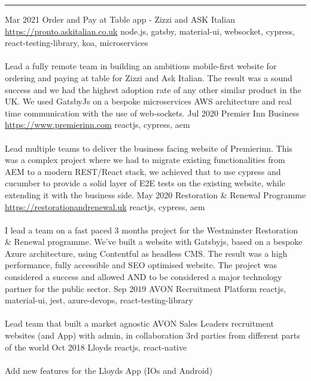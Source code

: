 \documentclass[9pt]{stackoverflow} %
\begin{document}
\textcolor{stackoverflow}{\hrule}
\vspace{4pt} %
\begin{tcolorbox}[blanker,width=0.75\textwidth,enlarge left by=0.25\textwidth,before skip=6pt,breakable,
	overlay unbroken and first={%
	  \node[inner sep=0pt,outer sep=0pt,text width=0.35\textwidth,
		align=none,
		below right]
		at ([xshift=-0.25\textwidth]frame.north west)
{
	\vspace{\baselineskip} %
	\cvsect{Apps \& Software}
};}]
{\vspace{-16.3pt} %
	\small\begin{entrylist}
	\entry
		{Mar 2021}
		{Order and Pay at Table app - Zizzi and ASK Italian}
		{\href{https://pronto.askitalian.co.uk}{https://pronto.askitalian.co.uk}}
		{{node.js, gatsby, material-ui, websocket, cypress, react-testing-library, koa, microservices}\\\\
		Lead a fully remote team in building an ambitious mobile-first website for ordering and paying at table for Zizzi and Ask Italian. The result was a sound success and we had the highest adoption rate of any other similar product in the UK. We used GatsbyJs on a bespoke microservices AWS architecture and real time communication with the use of web-sockets.}
	\entry
		{Jul 2020}
		{Premier Inn Business}
		{\href{https://www.premierinn.com}{https://www.premierinn.com}}
		{{reactjs, cypress, aem}\\\\
		Lead multiple teams to deliver the business facing website of Premierinn. This was a complex project where we had to migrate existing functionalities from AEM to a modern REST/React stack, we achieved that to use cypress and cucumber to provide a solid layer of E2E tests on the existing website, while extending it with the business side.}
	\entry
		{May 2020}
		{Restoration \& Renewal Programme}
		{\href{https://restorationandrenewal.uk}{https://restorationandrenewal.uk}}
		{{reactjs, cypress, aem}\\\\
		I lead a team on a fast paced 3 months project for the Westminster Restoration \& Renewal programme. We've built a website with Gatsbyjs, based on a bespoke Azure architecture, using Contentful as headless CMS. The result was a high performance, fully accessible and SEO optimised website. The project was considered a success and allowed AND to be considered a major technology partner for the public sector.}
	\entry
		{Sep 2019}
		{AVON Recruitment Platform}
		{}
		{{reactjs, material-ui, jest, azure-devops, react-testing-library}\\\\
		Lead team that built a market agnostic AVON Sales Leaders recruitment websites (and App) with admin, in collaboration 3rd parties from different parts of the world}
	\entry
		{Oct 2018}
		{Lloyds}
		{}
		{{reactjs, react-native}\\\\
		Add new features for the Lloyds App (IOs and Android)}
	\end{entrylist}}
\end{tcolorbox}
\end{document}
